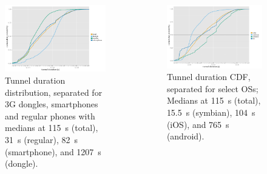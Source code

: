 \documentclass{beamer}
\begin{document}
\begin{frame}
	\begin{columns}[T]
		\begin{figure}
			\includegraphics[width=\columnwidth]{../../chapters/041-mobilenetsmeasuring/images/R-tunnel-duration-device-type.pdf}
			\caption{Tunnel duration distribution, separated for 3G dongles, smartphones and regular phones with medians at \SI{115}{\second} (total), \SI{31}{\second} (regular), \SI{82}{\second} (smartphone), and \SI{1207}{\second} (dongle).}
		\end{figure}

		\begin{figure}
			\includegraphics[width=\columnwidth]{../../chapters/041-mobilenetsmeasuring/images/R-tunnel-duration-operating-system.pdf}
			\caption{Tunnel duration CDF, separated for select OSs; Medians at \SI{115}{\second} (total), \SI{15.5}{\second} (symbian), \SI{104}{\second} (iOS), and \SI{765}{\second} (android).}
		\end{figure}
	\end{columns}
\end{frame}
\end{document}
